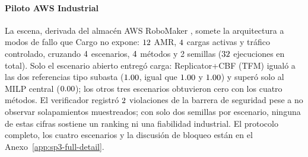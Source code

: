 

\paragraph{Piloto AWS Industrial}
La escena, derivada del almacén AWS RoboMaker \parencite{awsRobomakerWarehouse2021},
somete la arquitectura a modos de fallo que Cargo no expone: $12$
AMR, $4$ cargas activas y tráfico controlado, cruzando
$4$ escenarios, $4$ métodos y 2 semillas
($32$ ejecuciones en total). Solo el escenario abierto entregó
carga: Replicator+CBF (TFM) igualó a las dos referencias tipo subasta
($1.00$, igual que $1.00$ y
$1.00$) y superó solo al MILP central
($0.00$); los otros tres escenarios obtuvieron cero con
los cuatro métodos. El verificador registró $2$
violaciones de la barrera de seguridad pese a no observar solapamientos
muestreados; con solo dos semillas por escenario, ninguna de estas cifras
sostiene un ranking ni una fiabilidad industrial. El protocolo completo, los
cuatro escenarios y la discusión de bloqueo están en el
Anexo~\ref{app:sp3-full-detail}.

